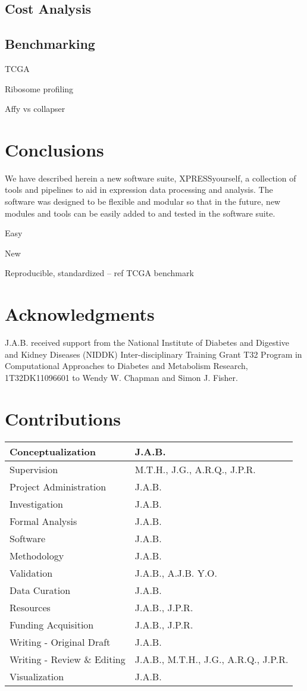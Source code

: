 \documentclass[11pt, a4paper, oneside]{article}
\begin{document}
\subsection{Cost Analysis}

\subsection{Benchmarking}

TCGA

Ribosome profiling

Affy vs collapser

\section{Conclusions}
We have described herein a new software suite, XPRESSyourself, a collection of tools and pipelines to aid in expression data processing and analysis. The software was designed to be flexible and modular so that in the future, new modules and tools can be easily added to and tested in the software suite.


Easy

New

Reproducible, standardized -- ref TCGA benchmark






\section*{Acknowledgments}
J.A.B. received support from the National Institute of Diabetes and Digestive and Kidney Diseases (NIDDK) Inter-disciplinary Training Grant T32 Program in Computational Approaches to Diabetes and Metabolism Research, 1T32DK11096601 to Wendy W. Chapman and Simon J. Fisher.


\section*{Contributions}
\begin{tabular}{ l l }
 Conceptualization & J.A.B. \\
 \hline
 Supervision & M.T.H., J.G., A.R.Q., J.P.R. \\
 \hline
 Project Administration & J.A.B. \\
 \hline
 Investigation & J.A.B. \\
 \hline
 Formal Analysis & J.A.B. \\
 \hline
 Software & J.A.B. \\
 \hline
 Methodology & J.A.B. \\
 \hline
 Validation & J.A.B., A.J.B. Y.O. \\
 \hline
 Data Curation & J.A.B. \\
 \hline
 Resources & J.A.B., J.P.R. \\
 \hline
 Funding Acquisition & J.A.B., J.P.R. \\
 \hline
 Writing - Original Draft & J.A.B. \\
 \hline
 Writing - Review \& Editing & J.A.B., M.T.H., J.G., A.R.Q., J.P.R. \\
 \hline
 Visualization & J.A.B.
\end{tabular}
\end{document}
